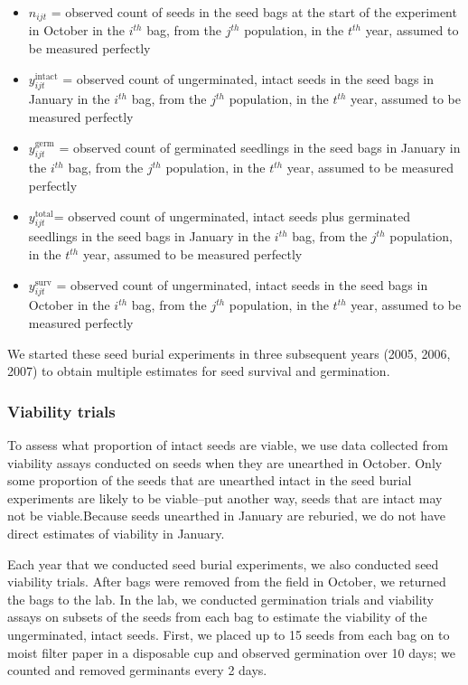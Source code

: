 \documentclass[12pt, oneside, titlepage]{article}   	%
\begin{document}
\begin{itemize}
	\item $n_{ijt}$ = observed count of seeds in the seed bags at the start of the experiment in October in the $i^{th}$ bag, from the $j^{th}$ population, in the $t^{th}$ year, assumed to be measured perfectly 
	\item $y^{\mathrm{intact}}_{ijt}$ = observed count of ungerminated, intact seeds in the seed bags in January in the $i^{th}$ bag, from the $j^{th}$ population, in the $t^{th}$ year,  assumed to be measured perfectly 
	\item $y^{\mathrm{germ}}_{ijt}$ = observed count of germinated seedlings in the seed bags in January in the $i^{th}$ bag, from the $j^{th}$ population, in the $t^{th}$ year, assumed to be measured perfectly 
	\item $y^{\mathrm{total}}_{ijt}$= observed count of ungerminated, intact seeds plus germinated seedlings in the seed bags in January in the $i^{th}$ bag, from the $j^{th}$ population, in the $t^{th}$ year, assumed to be measured perfectly 	
	\item $y^{\mathrm{surv}}_{ijt}$ = observed count of ungerminated, intact seeds in the seed bags in October in the $i^{th}$ bag, from the $j^{th}$ population, in the $t^{th}$ year, assumed to be measured perfectly 	
\end{itemize}

We started these seed burial experiments in three subsequent years (2005, 2006, 2007) to obtain multiple estimates for seed survival and germination. 

\subsubsection{Viability trials}

To assess what proportion of intact seeds are viable, we use data collected from viability assays conducted on seeds when they are unearthed in October.  Only some proportion of the seeds that are unearthed intact in the seed burial experiments are likely to be viable--put another way, seeds that are intact may not be viable.Because seeds unearthed in January are reburied, we do not have direct estimates of viability in January.

Each year that we conducted seed burial experiments, we also conducted seed viability trials. After bags were removed from the field in October, we returned the bags to the lab. In the lab, we conducted germination trials and viability assays on subsets of the seeds from each bag to estimate the viability of the ungerminated, intact seeds. First, we placed up to 15 seeds from each bag on to moist filter paper in a disposable cup and observed germination over 10 days; we counted and removed germinants every 2 days. 
\end{document}
